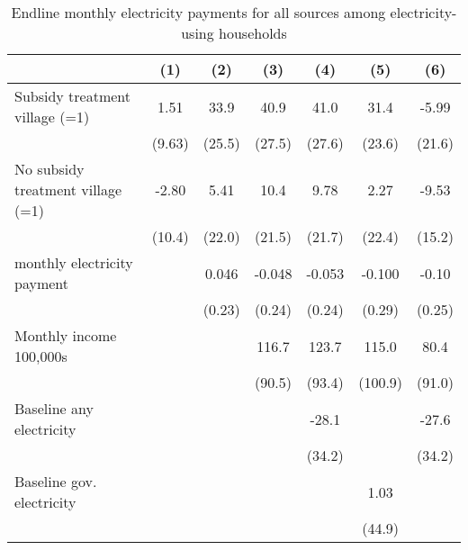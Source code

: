 \begin{table}[htbp]\centering
\def\sym#1{\ifmmode^{#1}\else\(^{#1}\)\fi}
\caption{Endline monthly electricity payments for all sources among electricity-using households}
\begin{tabular*}{1\hsize}{@{\hskip\tabcolsep\extracolsep\fill}l*{6}{c}}
\toprule
                &\multicolumn{1}{c}{(1)}         &\multicolumn{1}{c}{(2)}         &\multicolumn{1}{c}{(3)}         &\multicolumn{1}{c}{(4)}         &\multicolumn{1}{c}{(5)}         &\multicolumn{1}{c}{(6)}         \\
\midrule
Subsidy treatment village (=1)&     1.51         &     33.9         &     40.9         &     41.0         &     31.4         &    -5.99         \\
                &   (9.63)         &   (25.5)         &   (27.5)         &   (27.6)         &   (23.6)         &   (21.6)         \\
No subsidy treatment village (=1)&    -2.80         &     5.41         &     10.4         &     9.78         &     2.27         &    -9.53         \\
                &   (10.4)         &   (22.0)         &   (21.5)         &   (21.7)         &   (22.4)         &   (15.2)         \\
monthly electricity payment&                  &    0.046         &   -0.048         &   -0.053         &   -0.100         &    -0.10         \\
                &                  &   (0.23)         &   (0.24)         &   (0.24)         &   (0.29)         &   (0.25)         \\
Monthly income 100,000s&                  &                  &    116.7         &    123.7         &    115.0         &     80.4         \\
                &                  &                  &   (90.5)         &   (93.4)         &  (100.9)         &   (91.0)         \\
Baseline any electricity&                  &                  &                  &    -28.1         &                  &    -27.6         \\
                &                  &                  &                  &   (34.2)         &                  &   (34.2)         \\
Baseline gov. electricity&                  &                  &                  &                  &     1.03         &                  \\
                &                  &                  &                  &                  &   (44.9)         &                  \\

\end{tabular*}
\end{table}
